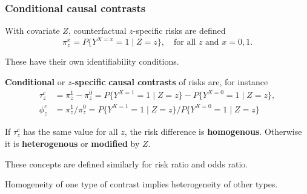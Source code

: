 \documentclass[12pt,dvipsnames,t,aspectratio=169, handout%
]{beamer}
\begin{document}
\begin{frame}
\frametitle{\large Conditional causal contrasts}

\bi
\item 
With covariate $Z$, {counterfactual}  $z$-specific risks are defined 
$$ \pi_z^x = P\{ Y^{X=x} = 1 \mid Z=z \},\quad \text{for all }z\text{ and } x=0,1. $$ 
\item
These have their own identifiability conditions. 
\medskip
\item
{\bf Conditional} or {\bf $z$-specific} {\bf causal contrasts} of risks are, for instance
\begin{align*}
 \tau_z^c & = \pi_z^1 - \pi_z^{0} = P\{ Y^{X=1} = 1 \mid Z=z \} - P\{ Y^{X=0} = 1 \mid Z=z \}, \\
 \phi_z^c & = \pi_z^{1}/\pi_z^{0} = P\{ Y^{X=1} = 1 \mid Z=z \} / P\{ Y^{X=0} = 1 \mid Z=z \}
\end{align*}
\item
If $\tau_z^c$ has the same value for all $z$, the risk difference is {\bf homogenous}. 
Otherwise it is {\bf heterogenous} or {\bf modified} by $Z$.
\medskip
\item
These concepts are defined similarly for risk ratio and odds ratio.
\medskip
\item
Homogeneity of one type of contrast implies heterogeneity of other types.
\ei

\end{frame}
\end{document}
